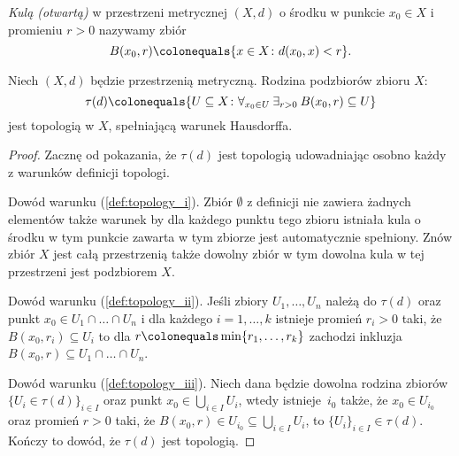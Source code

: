 {\begin{definition}[Kula]
        \emph{Kulą (otwartą)} w przestrzeni metrycznej $(X, d)$ o środku w punkcie $x_0\in X$ i promieniu $r > 0$ nazywamy zbiór
        \begin{equation}
            B(x_0, r) \colonequals \{x\in X\colon d(x_0, x) < r\}.
        \end{equation}
    \end{definition}
    \begin{theorem}
        Niech $(X, d)$ będzie przestrzenią metryczną. Rodzina podzbiorów zbioru $X$:
        \begin{equation}
            \label{eq:metric_topology}
            \tau(d) \colonequals \{U\subseteq X\colon\nforall{x_0\in U}\nexists{r>0} B(x_0, r)\subseteq U\}
        \end{equation}
        jest topologią w $X$, spełniającą warunek Hausdorffa.
    \end{theorem}
    \begin{proof}
        Zacznę od pokazania, że $\tau(d)$ jest topologią udowadniając osobno każdy z warunków definicji topologi.
        
        Dowód warunku (\ref{def:topology_i}). Zbiór $\emptyset$ z definicji nie zawiera żadnych elementów także warunek by dla każdego punktu tego zbioru istniała kula o środku w tym punkcie zawarta w tym zbiorze jest automatycznie spełniony. Znów zbiór $X$ jest całą przestrzenią także dowolny zbiór w tym dowolna kula w tej przestrzeni jest podzbiorem $X$.
                
        Dowód warunku (\ref{def:topology_ii}). Jeśli zbiory $U_1,\ldots,U_n$ należą do $\tau(d)$ oraz punkt $x_0\in U_1\cap\ldots\cap U_n$ i dla każdego $i = 1, \ldots, k$ istnieje promień $r_i > 0$ taki, że $B(x_0, r_i) \subseteq U_i$ to dla $r\colonequals\min\{r_1,\ldots,r_k\}$ zachodzi inkluzja $B(x_0, r)\subseteq U_1\cap\ldots\cap U_n$. 
        
        Dowód warunku (\ref{def:topology_iii}). Niech dana będzie dowolna rodzina zbiorów $\{U_i\in\tau(d)\}_{i\in I}$ oraz punkt $x_0\in\bigcup_{i\in I}U_i$, wtedy istnieje~$i_0$ także, że $x_0\in U_{i_0}$ oraz promień $r > 0$ taki, że $B(x_0, r)\in U_{i_0}\subseteq \bigcup_{i\in I}U_i $, to $\{U_i\}_{i\in I}\in \tau(d)$. Kończy to dowód, że $\tau(d)$ jest topologią. 
        

\end{proof}}
